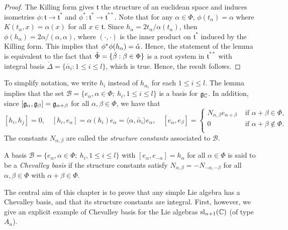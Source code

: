 \begin{proof}
    The Killing form gives $\mathfrak{t}$ the structure of an euclidean space and induces isometries $\phi:\mathfrak{t}\to\mathfrak{t}^*$ and $\phi^*:\mathfrak{t}^*\to\mathfrak{t}^{**}$. Note that for any $\alpha\in\Phi$, $\phi(t_\alpha)=\alpha$ where $K(t_\alpha,x)=\alpha(x)$ for all $x\in\mathfrak{t}$. Since $h_\alpha=2t_\alpha/\alpha(t_\alpha)$, then $\phi(h_\alpha)=2\alpha/(\alpha,\alpha)$, where $(\cdot,\cdot)$ is the inner product on $\mathfrak{t}^*$ induced by the Killing form. This implies that $\phi^*\phi(h_\alpha)=\check{\alpha}$. Hence, the statement of the lemma is equivalent to the fact that $\check{\Phi}=\{\check{\beta}:\beta\in\Phi\}$ is a root system in $\mathfrak{t}^{**}$ with integral basis $\check{\Delta}=\{\check{\alpha_i}:1\leq i\leq l\}$, which is true. Hence, the result follows.
\end{proof}

To simplify notation, we write $h_i$ instead of $h_{\alpha_i}$ for each $1\leq i\leq l$. The lemma implies that the set $\mathcal{B}=\{e_\alpha,\alpha\in\Phi;\ h_i,1\leq i\leq l\}$ is a basis for $\mathfrak{g}_{\mathbb{C}}$. In addition, since $[\mathfrak{g}_\alpha,\mathfrak{g}_\beta]=\mathfrak{g}_{\alpha+\beta}$ for all $\alpha,\beta\in\Phi$, we have that 
$$[h_i,h_j]=0,\quad[h_i,e_\alpha]=\alpha(h_i)e_\alpha=\langle\alpha,\check{\alpha_i}\rangle e_\alpha,\quad[e_\alpha,e_\beta]=\begin{cases}
    N_{\alpha,\beta}e_{\alpha+\beta} & \text{ if } \alpha+\beta\in\Phi,\\
    0 & \text{ if }\alpha+\beta\notin\Phi.\\
\end{cases}$$
The constants $N_{\alpha,\beta}$ are called the \textit{structure constants} associated to $\mathcal{B}$.

\begin{definition}
    A basis $\mathcal{B}=\{e_\alpha,\alpha\in\Phi;\ h_i,1\leq i\leq l\}$ with $[e_{\alpha},e_{-\alpha}]=h_\alpha$ for all $\alpha\in\Phi$ is said to be a \textit{Chevalley basis} if the structure constants satisfy $N_{\alpha,\beta}=-N_{-\alpha,-\beta}$ for all $\alpha,\beta\in\Phi$ with $\alpha+\beta\in\Phi$.
\end{definition}

The central aim of this chapter is to prove that any simple Lie algebra has a Chevalley basis, and that its structure constants are integral. First, however, we give an explicit example of Chevalley basis for the Lie algebras $\mathrm{sl}_{n+1}(\mathbb{C})$ (of type $A_n$).


